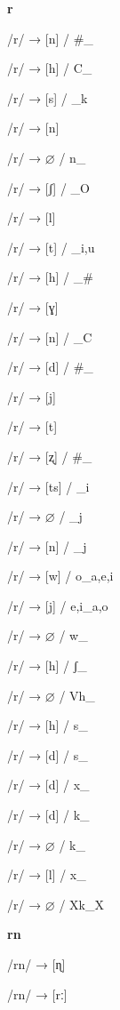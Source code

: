 \begin{center}\textbf{r}\end{center}
\begin{multicols}{4}
\noindent /r/ → [n] / \#\_

\noindent /r/ → [h] / C\_

\noindent /r/ → [s] / \_k

\noindent /r/ → [n]

\noindent /r/ → $\varnothing$ / n\_

\noindent /r/ → [ʃ] / \_O

\noindent /r/ → [l]

\noindent /r/ → [t] / \_{i,u}

\noindent /r/ → [h] / \_\#

\noindent /r/ → [ɣ]

\noindent /r/ → [n] / \_C

\noindent /r/ → [d] / \#\_

\noindent /r/ → [j]

\noindent /r/ → [t]

\noindent /r/ → [ʐ] / \#\_

\noindent /r/ → [ts] / \_i

\noindent /r/ → $\varnothing$ / \_j

\noindent /r/ → [n] / \_j

\noindent /r/ → [w] / o\_{a,e,i}

\noindent /r/ → [j] / {e,i}\_{a,o}

\noindent /r/ → $\varnothing$ / w\_

\noindent /r/ → [h] / ʃ\_

\noindent /r/ → $\varnothing$ / Vh\_

\noindent /r/ → [h] / s\_

\noindent /r/ → [d] / s\_

\noindent /r/ → [d] / x\_

\noindent /r/ → [d] / k\_

\noindent /r/ → $\varnothing$ / k\_

\noindent /r/ → [l] / x\_

\noindent /r/ → $\varnothing$ / Xk\_X

\end{multicols}

\begin{center}\textbf{rn}\end{center}
\begin{multicols}{4}
\noindent /rn/ → [ɳ]

\noindent /rn/ → [rː]

\end{multicols}

